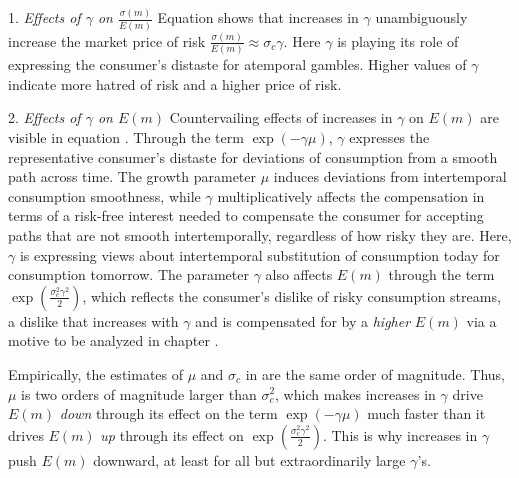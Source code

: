 \medskip
\item{1.} {\it Effects of $\gamma$ on ${\frac{\sigma(m)}{E(m)}}$} \quad Equation  shows that increases in $\gamma$ unambiguously increase the market price of risk ${\frac{\sigma(m)}{E(m)}} \approx \sigma_c \gamma$.
Here $\gamma$ is playing its role of expressing the consumer's distaste for atemporal gambles.  Higher values of $\gamma$ indicate more hatred of risk and a higher price of risk.
 \medskip

\item{2.}  {\it Effects of $\gamma$ on $E(m)$} \quad
 Countervailing effects of increases in $\gamma$ on $E(m)$ are visible in equation .  Through the term  $\exp(- \gamma \mu)$, $\gamma$  expresses
the representative consumer's distaste for deviations of consumption from a smooth path across time.
 The growth parameter $\mu$ induces  deviations from intertemporal consumption smoothness,
while $\gamma$ multiplicatively  affects the compensation in terms of a risk-free interest needed to compensate the consumer for accepting paths that are not smooth intertemporally, regardless of
how risky they are. Here, $\gamma$ is expressing views about intertemporal substitution of consumption today for consumption tomorrow.
The parameter $\gamma$ also affects $E(m)$ through the term $\exp\left({\frac{\sigma_c^{2}\gamma^2 }{2}}\right)$, which reflects the consumer's dislike of risky consumption streams, a dislike that increases with $\gamma$ and is  compensated for by a {\it higher} $E(m)$ via a  motive to be analyzed in chapter .

 \medskip

 Empirically, the estimates of $\mu$ and $\sigma_c$  in    are the same order of magnitude. Thus, $\mu$ is two orders of magnitude larger than $\sigma_c^2$, which makes increases in $\gamma$ drive $E(m)$ {\it down\/} through its effect on the term $\exp(- \gamma \mu)$ much faster
than it drives $E(m)$ {\it up\/} through its effect on $\exp\left({\frac{\sigma_c^{2}\gamma^2 }{2}}\right)$. This is why increases in $\gamma$ push $E(m)$ downward, at least for all but extraordinarily  large $\gamma$'s. %


